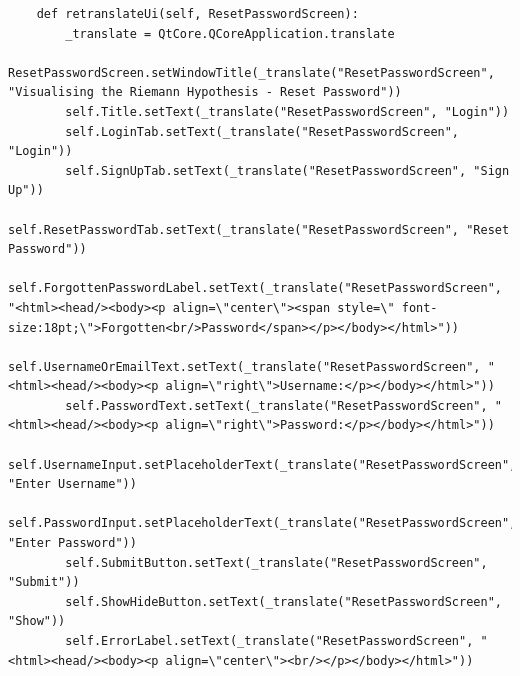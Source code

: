 \documentclass{article}
\begin{document}
\begin{lstlisting}
    def retranslateUi(self, ResetPasswordScreen):
        _translate = QtCore.QCoreApplication.translate
        ResetPasswordScreen.setWindowTitle(_translate("ResetPasswordScreen", "Visualising the Riemann Hypothesis - Reset Password"))
        self.Title.setText(_translate("ResetPasswordScreen", "Login"))
        self.LoginTab.setText(_translate("ResetPasswordScreen", "Login"))
        self.SignUpTab.setText(_translate("ResetPasswordScreen", "Sign Up"))
        self.ResetPasswordTab.setText(_translate("ResetPasswordScreen", "Reset Password"))
        self.ForgottenPasswordLabel.setText(_translate("ResetPasswordScreen", "<html><head/><body><p align=\"center\"><span style=\" font-size:18pt;\">Forgotten<br/>Password</span></p></body></html>"))
        self.UsernameOrEmailText.setText(_translate("ResetPasswordScreen", "<html><head/><body><p align=\"right\">Username:</p></body></html>"))
        self.PasswordText.setText(_translate("ResetPasswordScreen", "<html><head/><body><p align=\"right\">Password:</p></body></html>"))
        self.UsernameInput.setPlaceholderText(_translate("ResetPasswordScreen", "Enter Username"))
        self.PasswordInput.setPlaceholderText(_translate("ResetPasswordScreen", "Enter Password"))
        self.SubmitButton.setText(_translate("ResetPasswordScreen", "Submit"))
        self.ShowHideButton.setText(_translate("ResetPasswordScreen", "Show"))
        self.ErrorLabel.setText(_translate("ResetPasswordScreen", "<html><head/><body><p align=\"center\"><br/></p></body></html>"))
\end{lstlisting}
\end{document}

